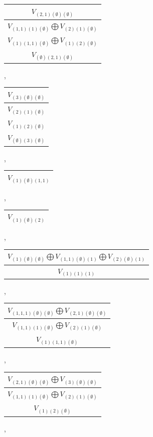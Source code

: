 \documentclass[letterpaper,11pt]{article}
\begin{document}
	\begin{tabular}{| c |}
		\hline
		$V_{(2,1)(\emptyset)(\emptyset)}$\\
		\hline
		$V_{(1,1)(1)(\emptyset)}$$\bigoplus$$V_{(2)(1)(\emptyset)}$\\
		\hline
		$V_{(1)(1,1)(\emptyset)}$$\bigoplus$$V_{(1)(2)(\emptyset)}$\\
		\hline
		$V_{(\emptyset)(2,1)(\emptyset)}$\\
		\hline
	\end{tabular}, 
	\begin{tabular}{| c |}
		\hline
		$V_{(3)(\emptyset)(\emptyset)}$\\
		\hline
		$V_{(2)(1)(\emptyset)}$\\
		\hline
		$V_{(1)(2)(\emptyset)}$\\
		\hline
		$V_{(\emptyset)(3)(\emptyset)}$\\
		\hline
	\end{tabular}, 
	\begin{tabular}{| c |}
		\hline
		$V_{(1)(\emptyset)(1,1)}$\\
		\hline
	\end{tabular}, 
	\begin{tabular}{| c |}
		\hline
		$V_{(1)(\emptyset)(2)}$\\
		\hline
	\end{tabular}, 
	\newline 
	\begin{tabular}{| c |}
		\hline
		$V_{(1)(\emptyset)(\emptyset)}$$\bigoplus$$V_{(1,1)(\emptyset)(1)}$$\bigoplus$$V_{(2)(\emptyset)(1)}$\\
		\hline
		$V_{(1)(1)(1)}$\\
		\hline
	\end{tabular}, 
	\begin{tabular}{| c |}
		\hline
		$V_{(1,1,1)(\emptyset)(\emptyset)}$$\bigoplus$$V_{(2,1)(\emptyset)(\emptyset)}$\\
		\hline
		$V_{(1,1)(1)(\emptyset)}$$\bigoplus$$V_{(2)(1)(\emptyset)}$\\
		\hline
		$V_{(1)(1,1)(\emptyset)}$\\
		\hline
	\end{tabular}, 
	\begin{tabular}{| c |}
		\hline
		$V_{(2,1)(\emptyset)(\emptyset)}$$\bigoplus$$V_{(3)(\emptyset)(\emptyset)}$\\
		\hline
		$V_{(1,1)(1)(\emptyset)}$$\bigoplus$$V_{(2)(1)(\emptyset)}$\\
		\hline
		$V_{(1)(2)(\emptyset)}$\\
		\hline
	\end{tabular}, 
\end{document}
